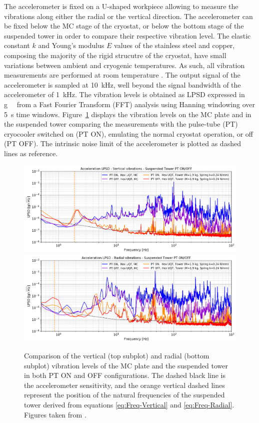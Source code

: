 The accelerometer is fixed on a U-shaped workpiece allowing to measure the vibrations along either the radial or the vertical direction.  The accelerometer can be fixed below the MC stage of the cryostat, or below the bottom stage of the suspended tower in order to compare their respective vibration level. 
The elastic constant $k$ and Young's modulus $E$ values of the stainless steel and copper, composing the majority of the rigid strucutre of the cryostat, have small variations between ambient and cryogenic temperatures. As such, all vibration measurements are performed at room temperature \cite{Emodulus}.
The output signal of the accelerometer is sampled at \SI{10}{\kilo\Hz}, well beyond the signal bandwidth of the accelerometer of \SI{1}{\kilo\Hz}. The vibration levels is obtained as LPSD expressed in \si{g \per \sqrthz} from a Fast Fourier Transform (FFT) analysis using Hanning windowing over \SI{5}{\s} time windows.
Figure~\ref{fig:vibration-levels} displays the vibration levels on the MC plate and in the suspended tower comparing the measurements with the pulse-tube (PT) cryocooler switched on (PT ON), emulating the normal cryostat operation, or off (PT OFF). The intrinsic noise limit of the accelerometer is plotted as dashed lines as reference.

\begin{figure}
\centering 
\includegraphics[width=\textwidth]{Figures/Experiment/vibration_vertical.pdf}
\includegraphics[width=\textwidth]{Figures/Experiment/vibration_radial.pdf}
\caption{Comparison of the vertical (top subplot) and radial (bottom subplot) vibration levels of the MC plate and the suspended tower in both PT ON and OFF configurations. The dashed black line is the accelerometer sensitivity, and the orange vertical dashed lines represent the position of the natural frequencies of the suspended tower derived from equations \ref{eq:Freq-Vertical} and \ref{eq:Freq-Radial}. Figures taken from \cite{Maisonobe:2018tbq}.}
\label{fig:vibration-levels}
\end{figure}

